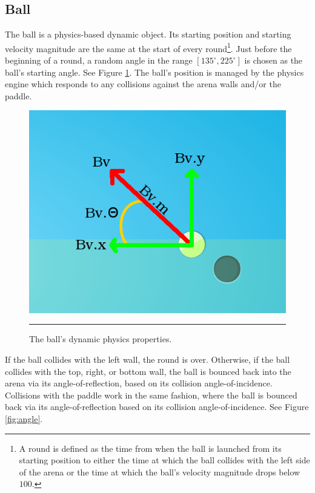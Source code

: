\subsection{Ball}

The ball is a physics-based dynamic object. Its starting position and starting velocity magnitude are the same at the start of every round\footnote{A round is defined as the time from when the ball is launched from its starting position to either the time at which the ball collides with the left side of the arena or the time at which the ball's velocity magnitude drops below $100$.}. Just before the beginning of a round, a random angle in the range $[135^\circ,225^\circ]$ is chosen as the ball's starting angle. See Figure \ref{fig:ball}. The ball's position is managed by the physics engine which responds to any collisions against the arena walls and/or the paddle.

\begin{figure}[htbp]  
  \centering
  \includegraphics[scale=0.5]{../Figures/Chapter3/ball.png}
  \rule{35em}{0.5pt}
  \caption[SimPL Arena Ball]{The ball's dynamic physics properties.}
  \label{fig:ball}
\end{figure}

If the ball collides with the left wall, the round is over. Otherwise, if the ball collides with the top, right, or bottom wall, the ball is bounced back into the arena via its angle-of-reflection, based on its collision angle-of-incidence. Collisions with the paddle work in the same fashion, where the ball is bounced back via its angle-of-reflection based on its collision angle-of-incidence. See Figure \ref{fig:angle}.

